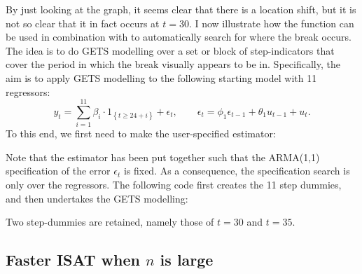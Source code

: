 %
By just looking at the graph, it seems clear that there is a location shift, but it is not so clear that it in fact occurs at $t=30$. I now illustrate how the  function can be used in combination with  to automatically search for where the break occurs. The idea is to do GETS modelling over a set or block of step-indicators that cover the period in which the break visually appears to be in. Specifically, the aim is to apply GETS modelling to the following starting model with 11 regressors:
%
\begin{equation*}
	y_t = \sum_{i=1}^{11} \beta_i \cdot 1_{ \left\{ t \geq 24+i \right\} } + \epsilon_t, \qquad \epsilon_t = \phi_1 \epsilon_{t-1} + \theta_1 u_{t-1} + u_t.
\end{equation*} 
%
To this end, we first need to make the user-specified estimator:
%
%
Note that the estimator has been put together such that the ARMA(1,1) specification of the error $\epsilon_t$ is fixed. As a consequence, the specification search is only over the regressors. The following code first creates the 11 step dummies, and then undertakes the GETS modelling:
%
%
Two step-dummies are retained, namely those of $t=30$ and $t=35$.

\subsection{Faster ISAT when $n$ is large}

